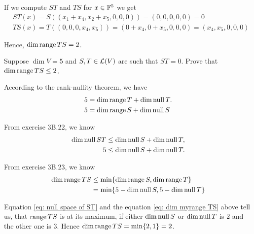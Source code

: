 \begin{xrcs}
\begin{enumerate}
{      If we compute $ST$ and $TS$ for $x \in \mathbb{F}^5$ we get
      \begin{equation}
        \begin{aligned}
          &ST(x) = S((x_1 + x_4, x_2 + x_5, 0,0,0)) = (0,0,0,0,0) = 0 \\
          &TS(x) = T((0,0,0,x_4,x_5)) = (0+x_4, 0+x_5, 0,0,0) = (x_4, x_5, 0,0,0)
        \end{aligned}
      \end{equation}

      Hence, $\dim \operatorname{range} TS = 2$.
    }

  \end{enumerate}

\end{xrcs}

\begin{xrcs}
  Suppose $\dim V = 5$ and $S, T \in \mathcal{L} (V)$ are such that $ST = 0$. Prove that $\dim \operatorname{range} TS \leq 2$.

  \begin{xprf}
    According to the rank-nullity theorem, we have
    \begin{equation}
      \begin{aligned}
        5 &= \dim \operatorname{range} T + \dim \operatorname{null} T. \\
        5 &= \dim \operatorname{range} S + \dim \operatorname{null} S
      \end{aligned}
    \end{equation}

    From exercise 3B.22, we know
    \begin{equation}
      \begin{aligned}
        \label{eq:  null space of ST}
        \dim \operatorname{null} ST & \leq \dim \operatorname{null} S + \dim \operatorname{null} T, \\
        5 & \leq \dim \operatorname{null} S + \dim \operatorname{null} T.
      \end{aligned}
    \end{equation}

    From exercise 3B.23, we know
    \begin{equation}
      \begin{aligned}
        \label{eq: dim myrange TS}
        \dim \operatorname{range} TS & \leq \min \{ \dim \operatorname{range} S, \dim \operatorname{range} T\} \\
        & =     \min \{ 5 - \dim \operatorname{null} S, 5 - \dim \operatorname{null} T \}
      \end{aligned}
    \end{equation}

    Equation \eqref{eq: null space of ST} and the equation \eqref{eq: dim myrange TS} above tell us, that $\operatorname{range} TS$ is at its maximum, if either $\dim \operatorname{null} S$ or $\dim \operatorname{null} T$ is $2$ and the other one is $3$. Hence $\dim \operatorname{range} TS = \min \{2,1\} = 2$.
  \end{xprf}
\end{xrcs}

